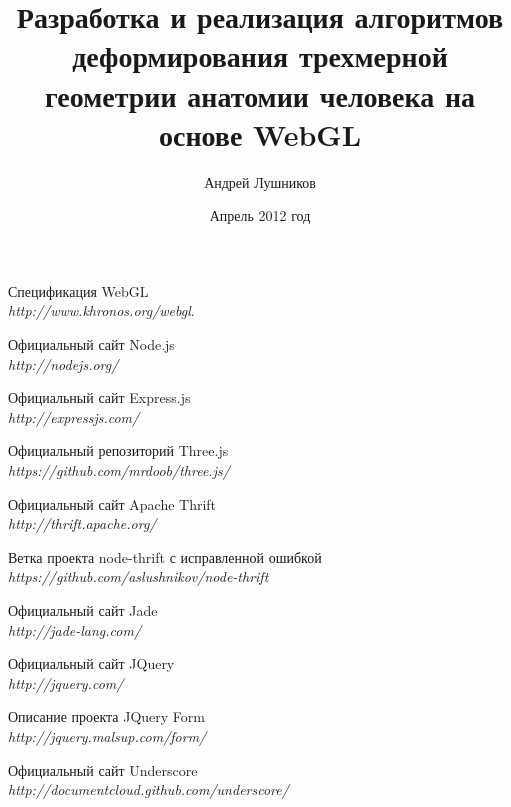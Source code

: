 \documentclass[14pt, a4paper]{extarticle}
\author{Андрей Лушников}
\title{Разработка и реализация алгоритмов деформирования трехмерной геометрии
анатомии человека на основе WebGL}
\date{Апрель 2012 год}
\begin{document}



\setcounter{page}{1}
\tableofcontents
\newpage

















\begin{thebibliography}{9}

  Спецификация WebGL \\
  \emph{http://www.khronos.org/webgl}.

  Официальный сайт Node.js \\
  \emph{http://nodejs.org/}

  Официальный сайт Express.js \\
  \emph{http://expressjs.com/}

  Официальный репозиторий Three.js \\
  \emph{https://github.com/mrdoob/three.js/}

  Официальный сайт Apache Thrift \\
  \emph{http://thrift.apache.org/}

  Ветка проекта node-thrift с исправленной ошибкой \\
  \emph{https://github.com/aslushnikov/node-thrift}

  Официальный сайт Jade \\
  \emph{http://jade-lang.com/}

  Официальный сайт JQuery \\
  \emph{http://jquery.com/}

  Описание проекта JQuery Form \\
  \emph{http://jquery.malsup.com/form/}

  Официальный сайт Underscore \\
  \emph{http://documentcloud.github.com/underscore/}


\end{thebibliography}
\end{document}
